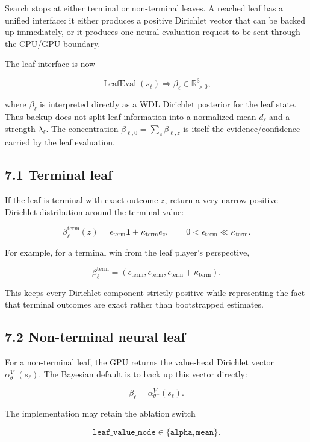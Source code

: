 \documentclass[11pt]{article}
\newcommand{\R}{\mathbb{R}}
\begin{document}
Search stops at either terminal or non-terminal leaves. A reached leaf has a
unified interface: it either produces a positive Dirichlet vector that can be
backed up immediately, or it produces one neural-evaluation request to be sent
through the CPU/GPU boundary.

The leaf interface is now

\[
\operatorname{LeafEval}(s_\ell)
\Rightarrow
\beta_\ell\in\R_{>0}^3,
\]

where \(\beta_\ell\) is interpreted directly as a WDL Dirichlet posterior for the
leaf state. Thus backup does not split leaf information into a normalized mean
\(d_\ell\) and a strength \(\lambda_\ell\). The concentration
\(\beta_{\ell,0}=\sum_z\beta_{\ell,z}\) is itself the evidence/confidence carried
by the leaf evaluation.

\subsection*{7.1 Terminal leaf}

If the leaf is terminal with exact outcome \(z\), return a very narrow positive
Dirichlet distribution around the terminal value:

\[
\beta_\ell^{\mathrm{term}}(z)
=
\epsilon_{\mathrm{term}}\mathbf{1}
+
\kappa_{\mathrm{term}} e_z,
\qquad
0<\epsilon_{\mathrm{term}}\ll \kappa_{\mathrm{term}}.
\]

For example, for a terminal win from the leaf player's perspective,

\[
\beta_\ell^{\mathrm{term}}
=
(\epsilon_{\mathrm{term}},
 \epsilon_{\mathrm{term}},
 \epsilon_{\mathrm{term}}+\kappa_{\mathrm{term}}).
\]

This keeps every Dirichlet component strictly positive while representing the
fact that terminal outcomes are exact rather than bootstrapped estimates.

\subsection*{7.2 Non-terminal neural leaf}

For a non-terminal leaf, the GPU returns the value-head Dirichlet vector
\(\alpha_{\theta^-}^V(s_\ell)\). The Bayesian default is to back up this vector
directly:

\[
\beta_\ell
=
\alpha_{\theta^-}^V(s_\ell).
\]

The implementation may retain the ablation switch

\[
\texttt{leaf\_value\_mode}
\in
\{\texttt{alpha},\texttt{mean}\}.
\]
\end{document}
